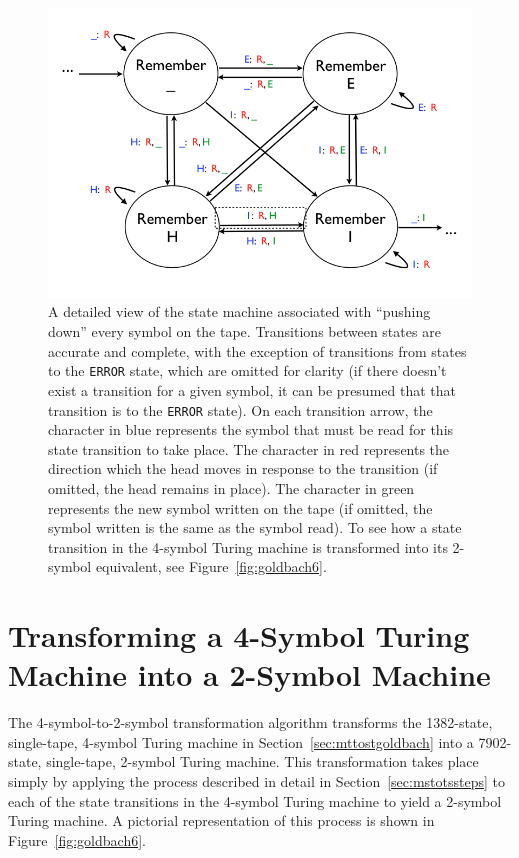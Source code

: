 \documentclass[11pt]{report}
\begin{document}
\begin{figure} 
\begin{center} 
\includegraphics[scale=0.4]{figs/goldbach5.png} 
\caption{A detailed view of the state machine associated with ``pushing down'' every symbol on the tape. Transitions between states are accurate and complete, with the exception of transitions from states to the \texttt{ERROR} state, which are omitted for clarity (if there doesn't exist a transition for a given symbol, it can be presumed that that transition is to the \texttt{ERROR} state). On each transition arrow, the character in blue represents the symbol that must be read for this state transition to take place. The character in red represents the direction which the head moves in response to the transition (if omitted, the head remains in place). The character in green represents the new symbol written on the tape (if omitted, the symbol written is the same as the symbol read). To see how a state transition in the 4-symbol Turing machine is transformed into its 2-symbol equivalent, see Figure~\ref{fig:goldbach6}. \label{fig:goldbach5}}
\end{center} 
\end{figure}

\section{Transforming a 4-Symbol Turing Machine into a 2-Symbol Machine \label{sec:mstotsgoldbach}}

The 4-symbol-to-2-symbol transformation algorithm transforms the 1382-state, single-tape, 4-symbol Turing machine in Section~\ref{sec:mttostgoldbach} into a 7902-state, single-tape, 2-symbol Turing machine. This transformation takes place simply by applying the process described in detail in Section~\ref{sec:mstotssteps} to each of the state transitions in the 4-symbol Turing machine to yield a 2-symbol Turing machine. A pictorial representation of this process is shown in Figure~\ref{fig:goldbach6}.
\end{document}
